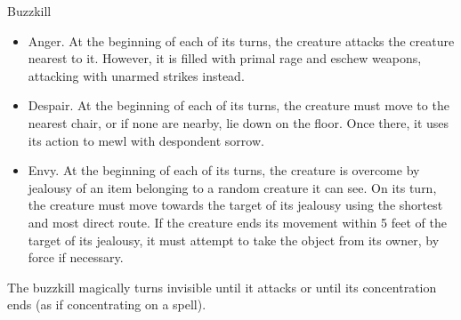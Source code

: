 \documentclass[10pt,a4paper,twoside,twocolumn,openany,bg=print,nodeprecatedcode]{dndbook}
\begin{document}
\begin{DndMonster}[float*=t]{Buzzkill}
\begin{itemize}
\item Anger. At the beginning of each of its turns, the creature attacks the creature nearest to it. However, it is filled with primal rage and eschew weapons, attacking with unarmed strikes instead.
\item Despair. At the beginning of each of its turns, the creature must move to the nearest chair, or if none are nearby, lie down on the floor. Once there, it uses its action to mewl with despondent sorrow.
\item Envy. At the beginning of each of its turns, the creature is overcome by jealousy of an item belonging to a random creature it can see. On its turn, the creature must move towards the target of its jealousy using the shortest and most direct route. If the creature ends its movement within 5 feet of the target of its jealousy, it must attempt to take the object from its owner, by force if necessary.
\end{itemize}

The buzzkill magically turns invisible until it attacks or until its concentration ends (as if concentrating on a spell).
\end{DndMonster}
\end{document}
